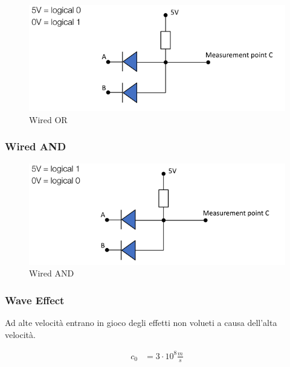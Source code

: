 \begin{figure}[!ht]
  \begin{adjustbox}{width=0.5\columnwidth, center}
    \includegraphics{images/wired_or.png}
  \end{adjustbox}
  \caption{Wired OR}
  \label{fig:wired_or}
\end{figure}

\subsubsection{Wired AND}

\begin{figure}[!ht]
  \begin{adjustbox}{width=0.5\columnwidth, center}
    \includegraphics{images/wired_and.png}
  \end{adjustbox}
  \caption{Wired AND}
  \label{fig:wired_and}
\end{figure}


\subsubsection{Wave Effect}
Ad alte velocità entrano in gioco degli effetti non volueti a causa dell'alta velocità.

\begin{align}
  c_0 &= 3 \cdot 10^8 \frac{m}{s}
  \label{eq:velocita_luce}
\end{align}

